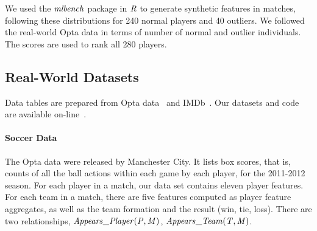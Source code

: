 \documentclass[conference]{IEEEtran}
\begin{document}
				
				
				
				
				
				We used the $\it{mlbench}$ package in $\it{R}$ to generate synthetic features in matches, following these distributions for 240 normal players and 40 outliers. We followed the real-world Opta data in terms of number of normal and outlier individuals. The scores are used to rank all 280 players. 
				\subsection{Real-World Datasets} \label{sec:real-world-data}
				Data tables are prepared from Opta data~\cite{opta-original} and IMDb~\cite{IMDb-original}. Our datasets and code are available on-line~\cite{bib:jbnsite}.
				\paragraph{Soccer Data} 
The Opta data were released by Manchester City. 
It lists box scores, that is, counts of all the ball actions within each game by each player, for the 2011-2012 season. 
For each player in a match, our data set contains eleven player features.
For each team in a match, there are five features computed as player feature aggregates, as well as the team formation and the result (win, tie, loss). 
There are two relationships, $\it{Appears\_Player}(P,M)$, $\it{Appears\_Team}(T,M)$. 
\end{document}
